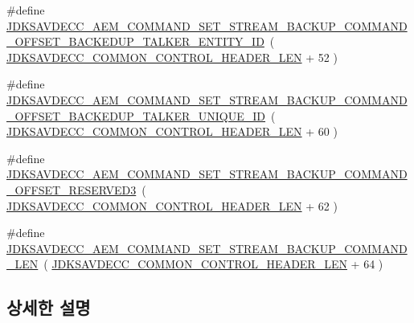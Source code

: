 \begin{DoxyCompactItemize}
\item 
\#define \hyperlink{group__command__set__stream__backup_ga4f9a989fed3a65e5f938122f97434618}{J\+D\+K\+S\+A\+V\+D\+E\+C\+C\+\_\+\+A\+E\+M\+\_\+\+C\+O\+M\+M\+A\+N\+D\+\_\+\+S\+E\+T\+\_\+\+S\+T\+R\+E\+A\+M\+\_\+\+B\+A\+C\+K\+U\+P\+\_\+\+C\+O\+M\+M\+A\+N\+D\+\_\+\+O\+F\+F\+S\+E\+T\+\_\+\+B\+A\+C\+K\+E\+D\+U\+P\+\_\+\+T\+A\+L\+K\+E\+R\+\_\+\+E\+N\+T\+I\+T\+Y\+\_\+\+ID}~( \hyperlink{group__jdksavdecc__avtp__common__control__header_gaae84052886fb1bb42f3bc5f85b741dff}{J\+D\+K\+S\+A\+V\+D\+E\+C\+C\+\_\+\+C\+O\+M\+M\+O\+N\+\_\+\+C\+O\+N\+T\+R\+O\+L\+\_\+\+H\+E\+A\+D\+E\+R\+\_\+\+L\+EN} + 52 )
\item 
\#define \hyperlink{group__command__set__stream__backup_ga6676aef19e8799ea6a4e680c47c38a37}{J\+D\+K\+S\+A\+V\+D\+E\+C\+C\+\_\+\+A\+E\+M\+\_\+\+C\+O\+M\+M\+A\+N\+D\+\_\+\+S\+E\+T\+\_\+\+S\+T\+R\+E\+A\+M\+\_\+\+B\+A\+C\+K\+U\+P\+\_\+\+C\+O\+M\+M\+A\+N\+D\+\_\+\+O\+F\+F\+S\+E\+T\+\_\+\+B\+A\+C\+K\+E\+D\+U\+P\+\_\+\+T\+A\+L\+K\+E\+R\+\_\+\+U\+N\+I\+Q\+U\+E\+\_\+\+ID}~( \hyperlink{group__jdksavdecc__avtp__common__control__header_gaae84052886fb1bb42f3bc5f85b741dff}{J\+D\+K\+S\+A\+V\+D\+E\+C\+C\+\_\+\+C\+O\+M\+M\+O\+N\+\_\+\+C\+O\+N\+T\+R\+O\+L\+\_\+\+H\+E\+A\+D\+E\+R\+\_\+\+L\+EN} + 60 )
\item 
\#define \hyperlink{group__command__set__stream__backup_gab048e05434c2ea8ff02dce2f0e1f3dab}{J\+D\+K\+S\+A\+V\+D\+E\+C\+C\+\_\+\+A\+E\+M\+\_\+\+C\+O\+M\+M\+A\+N\+D\+\_\+\+S\+E\+T\+\_\+\+S\+T\+R\+E\+A\+M\+\_\+\+B\+A\+C\+K\+U\+P\+\_\+\+C\+O\+M\+M\+A\+N\+D\+\_\+\+O\+F\+F\+S\+E\+T\+\_\+\+R\+E\+S\+E\+R\+V\+E\+D3}~( \hyperlink{group__jdksavdecc__avtp__common__control__header_gaae84052886fb1bb42f3bc5f85b741dff}{J\+D\+K\+S\+A\+V\+D\+E\+C\+C\+\_\+\+C\+O\+M\+M\+O\+N\+\_\+\+C\+O\+N\+T\+R\+O\+L\+\_\+\+H\+E\+A\+D\+E\+R\+\_\+\+L\+EN} + 62 )
\item 
\#define \hyperlink{group__command__set__stream__backup_gaf2356bf2fddb5b1b2fe947562078300b}{J\+D\+K\+S\+A\+V\+D\+E\+C\+C\+\_\+\+A\+E\+M\+\_\+\+C\+O\+M\+M\+A\+N\+D\+\_\+\+S\+E\+T\+\_\+\+S\+T\+R\+E\+A\+M\+\_\+\+B\+A\+C\+K\+U\+P\+\_\+\+C\+O\+M\+M\+A\+N\+D\+\_\+\+L\+EN}~( \hyperlink{group__jdksavdecc__avtp__common__control__header_gaae84052886fb1bb42f3bc5f85b741dff}{J\+D\+K\+S\+A\+V\+D\+E\+C\+C\+\_\+\+C\+O\+M\+M\+O\+N\+\_\+\+C\+O\+N\+T\+R\+O\+L\+\_\+\+H\+E\+A\+D\+E\+R\+\_\+\+L\+EN} + 64 )
\end{DoxyCompactItemize}


\subsection{상세한 설명}


